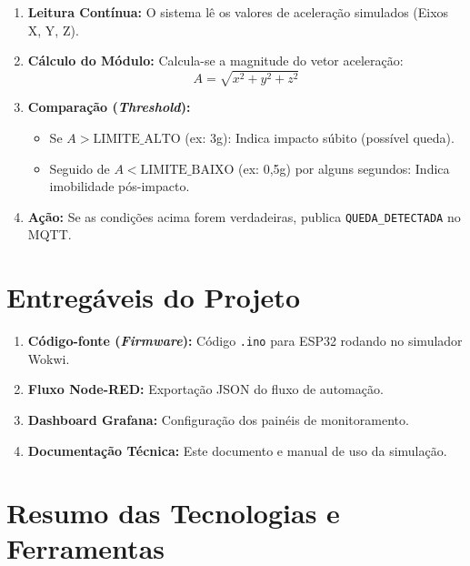 \documentclass[a4paper,12pt]{article}
\begin{document}
\begin{enumerate}[leftmargin=2cm]
    \item \textbf{Leitura Contínua:} O sistema lê os valores de aceleração simulados (Eixos X, Y, Z).

    \item \textbf{Cálculo do Módulo:} Calcula-se a magnitude do vetor aceleração:
    \[
    A = \sqrt{x^2 + y^2 + z^2}
    \]

    \item \textbf{Comparação (\textit{Threshold}):}
    \begin{itemize}
        \item Se $A > \text{LIMITE\_ALTO}$ (ex: 3g): Indica impacto súbito (possível queda).
        \item Seguido de $A < \text{LIMITE\_BAIXO}$ (ex: 0,5g) por alguns segundos: Indica imobilidade pós-impacto.
    \end{itemize}

    \item \textbf{Ação:} Se as condições acima forem verdadeiras, publica \texttt{QUEDA\_DETECTADA} no MQTT.
\end{enumerate}

\section{Entregáveis do Projeto}

\begin{enumerate}[leftmargin=2cm]
    \item \textbf{Código-fonte (\textit{Firmware}):} Código \texttt{.ino} para ESP32 rodando no simulador Wokwi.
    \item \textbf{Fluxo Node-RED:} Exportação JSON do fluxo de automação.
    \item \textbf{Dashboard Grafana:} Configuração dos painéis de monitoramento.
    \item \textbf{Documentação Técnica:} Este documento e manual de uso da simulação.
\end{enumerate}

\section{Resumo das Tecnologias e Ferramentas}
\end{document}
